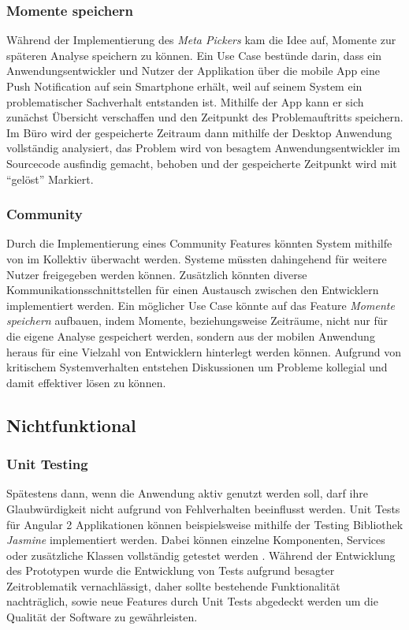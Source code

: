 \subsubsection{Momente speichern}

Während der Implementierung des \emph{Meta Pickers} kam die Idee auf, Momente zur späteren Analyse speichern zu können.
Ein Use Case bestünde darin, dass ein Anwendungsentwickler und Nutzer der Applikation \projectname{}
über die mobile App eine Push Notification auf sein Smartphone erhält, weil auf seinem System ein problematischer Sachverhalt
entstanden ist. Mithilfe der App kann er sich zunächst Übersicht verschaffen und den Zeitpunkt des Problemauftritts speichern.
Im Büro wird der gespeicherte Zeitraum dann mithilfe der Desktop Anwendung vollständig analysiert,
das Problem wird von besagtem Anwendungsentwickler im Sourcecode ausfindig gemacht, behoben und der gespeicherte Zeitpunkt wird mit ``gelöst'' Markiert.

\subsubsection{Community}

Durch die Implementierung eines Community Features könnten System mithilfe von \projectname{} im Kollektiv überwacht werden.
Systeme müssten dahingehend für weitere Nutzer freigegeben werden können.
Zusätzlich könnten diverse Kommunikationsschnittstellen für einen
Austausch zwischen den Entwicklern implementiert werden. Ein möglicher Use Case könnte auf das Feature
\emph{Momente speichern} aufbauen,
indem Momente, beziehungsweise Zeiträume, nicht nur für die eigene Analyse gespeichert werden, sondern aus der mobilen Anwendung heraus
für eine Vielzahl von Entwicklern hinterlegt werden können.
Aufgrund von kritischem Systemverhalten entstehen Diskussionen um Probleme kollegial und damit effektiver lösen zu können.

\subsection{Nichtfunktional}


\subsubsection{Unit Testing}

Spätestens dann, wenn die Anwendung aktiv genutzt werden soll, darf ihre Glaubwürdigkeit nicht aufgrund von Fehlverhalten beeinflusst werden.
Unit Tests für Angular 2 Applikationen können beispielsweise mithilfe der Testing Bibliothek \emph{Jasmine} implementiert werden.
Dabei können einzelne Komponenten, Services oder zusätzliche Klassen vollständig getestet werden \cite{Angul78:online}.
Während der Entwicklung des Prototypen \projectname{} wurde die Entwicklung von Tests aufgrund besagter Zeitroblematik vernachlässigt,
daher sollte bestehende Funktionalität nachträglich, sowie neue Features durch Unit Tests abgedeckt werden um die Qualität der Software zu gewährleisten.

